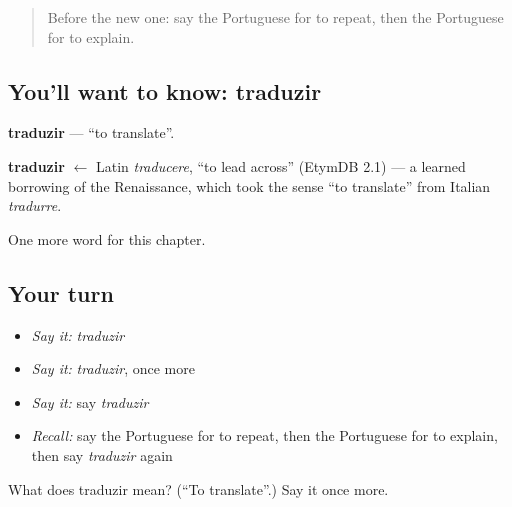 \begin{quote}
Before the new one: say the Portuguese for to repeat, then the Portuguese for to explain.
\end{quote}

\subsection*{You'll want to know: traduzir}
\textbf{traduzir} — \textquotedblleft{}to translate\textquotedblright{}.

\begin{cousinweb}
\textbf{traduzir} $\leftarrow$ Latin \emph{traducere}, \textquotedblleft{}to lead across\textquotedblright{} (EtymDB 2.1) — a learned borrowing of the Renaissance, which took the sense \textquotedblleft{}to translate\textquotedblright{} from Italian \emph{tradurre}.
\end{cousinweb}

\begin{grammarlens}[title={What you've built}]
One more word for this chapter.
\end{grammarlens}

\subsection*{Your turn}
\begin{itemize}
\raggedright
  \item \emph{Say it:} \emph{traduzir}
  \item \emph{Say it:} \emph{traduzir}, once more
  \item \emph{Say it:} say \emph{traduzir}
  \item \emph{Recall:} say the Portuguese for to repeat, then the Portuguese for to explain, then say \emph{traduzir} again
\end{itemize}

\begin{tcolorbox}[breakable,colback=teal!4,colframe=teal!35!black,title={Before you move on}]
What does traduzir mean? (\textquotedblleft{}To translate\textquotedblright{}.) Say it once more.
\end{tcolorbox}
